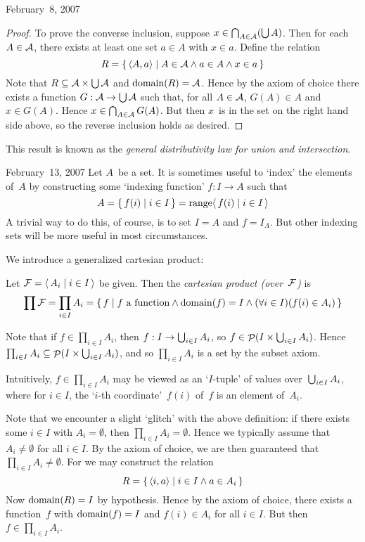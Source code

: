 \begin{lecture}{February~8, 2007}
\begin{proof}
To prove the converse inclusion, suppose \(x\in\bigcap_{A\in\mathcal{A}}(\bigcup A)\). Then for each \(A\in\mathcal{A}\), there exists at least one set \(a\in A\) with \(x\in a\). Define the relation
\[R=\{\,\langle{A},{a}\rangle\mid A\in\mathcal{A}\land a\in A\land x\in a\,\}\]
Note that \(R\subseteq\mathcal{A}\times\bigcup\mathcal{A}\) and \(\operatorname{domain}(R)=\mathcal{A}\). Hence by the axiom of choice there exists a function \(G:\mathcal{A}\to\bigcup\mathcal{A}\) such that, for all \(A\in\mathcal{A}\), \(G(A)\in A\) and \(x\in G(A)\). Hence \(x\in\bigcap_{A\in\mathcal{A}} G(A)\). But then \(x\)~is in the set on the right hand side above, so the reverse inclusion holds as desired.
\end{proof}
\noindent This result is known as the \emph{general distributivity law for union and intersection}.
\end{lecture}

\begin{lecture}{February~13, 2007}
Let \(A\)~be a set. It is sometimes useful to `index' the elements of~\(A\) by constructing some `indexing function' \(f:I\to A\) such that
\[A=\{\,f(i)\mid i\in I\,\}=\operatorname{range}\langle\,{f(i)}\mid{i\in I}\,\rangle\]
A trivial way to do this, of course, is to set \(I=A\) and \(f=I_A\). But other indexing sets will be more useful in most circumstances.

We introduce a generalized cartesian product:
\begin{defn}
Let \(\mathcal{F}=\langle\,{A_i}\mid{i\in I}\,\rangle\) be given. Then the \emph{cartesian product (over~\(\mathcal{F}\))} is
\[\prod\mathcal{F}=\prod_{i\in I}A_i=\{\,f\mid f\text{ a function}\land\operatorname{domain}(f)=I\land(\forall i\in I)(f(i)\in A_i)\,\}\]
\end{defn}
\noindent Note that if \(f\in\prod_{i\in I}A_i\), then \(f:I\to\bigcup_{i\in I}A_i\), so \(f\in\mathop{\mathcal{P}}(I\times \bigcup_{i\in I}A_i)\). Hence \(\prod_{i\in I}A_i\subseteq\mathop{\mathcal{P}}(I\times\bigcup_{i\in I}A_i)\), and so \(\prod_{i\in I}A_i\) is a set by the subset axiom.

Intuitively, \(f\in\prod_{i\in I}A_i\) may be viewed as an `\(I\)-tuple' of values over~\(\bigcup_{i\in I}A_i\), where for \(i\in I\), the `\(i\)-th coordinate'~\(f(i)\) of~\(f\) is an element of~\(A_i\).

Note that we encounter a slight `glitch' with the above definition: if there exists some \(i\in I\) with \(A_i=\emptyset\), then \(\prod_{i\in I}A_i=\emptyset\). Hence we typically assume that \(A_i\ne\emptyset\) for all \(i\in I\). By the axiom of choice, we are then guaranteed that \(\prod_{i\in I}A_i\ne\emptyset\). For we may construct the relation
\[R=\{\,\langle{i},{a}\rangle\mid i\in I\land a\in A_i\,\}\]
Now \(\operatorname{domain}(R)=I\) by hypothesis. Hence by the axiom of choice, there exists a function~\(f\) with \(\operatorname{domain}(f)=I\) and \(f(i)\in A_i\) for all \(i\in I\). But then \(f\in\prod_{i\in I}A_i\).


\end{lecture}
